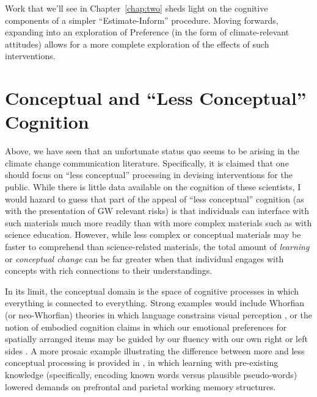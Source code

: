 Work that we'll see in Chapter~\ref{chap:two} sheds light on the cognitive
components of a simpler “Estimate-Inform” procedure. Moving forwards, expanding
into an exploration of Preference (in the form of climate-relevant attitudes)
allows for a more complete exploration of the effects of such interventions.

\section{Conceptual and \texorpdfstring{``Less Conceptual''}{``Less Conceptual''} Cognition}
\label{sec:two}


Above, we have seen that an unfortunate status quo seems to be arising in the
climate change communication literature. Specifically, it is claimed that one
should focus on ``less conceptual'' processing in devising interventions for the
public.  While there is little data available on the cognition of these
scientists, I would hazard to guess that part of the appeal of ``less
conceptual'' cognition (as with the presentation of GW relevant risks) is that
individuals can interface with such materials much more readily than with more
complex materials such as with science education. However, while less complex or
conceptual materials may be faster to comprehend than science-related materials,
the total amount of \emph{learning} or \emph{conceptual change} can be far
greater when that individual engages with concepts with rich connections to
their understandings.

In its limit, the conceptual domain is the space of cognitive processes in which
everything is connected to everything. Strong examples would include Whorfian
(or neo-Whorfian) theories in which language constrains visual perception
\parencite{boroditsky_does_2001}, or the notion of embodied cognition claims in
which our emotional preferences for spatially arranged items may be guided by
our fluency with our own right or left sides
\parencite{casasanto_embodiment_2009}. A more prosaic example illustrating the
difference between more and less conceptual processing is provided in
\textcite{clark_assembling_2003}, in which learning with pre-existing knowledge
(specifically, encoding known words versus plausible pseudo-words) lowered demands
on prefrontal and parietal working memory structures.

